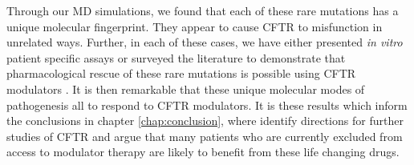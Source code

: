 Through our MD simulations, we found that each of these rare mutations has a unique molecular fingerprint. They appear to cause CFTR to misfunction in unrelated ways. Further, in each of these cases, we have either presented \textit{in vitro} patient specific assays or surveyed the literature to demonstrate that pharmacological rescue of these rare mutations is possible using CFTR modulators \cite{R334W_Euro_CF_trial}.  It is then remarkable that these unique molecular modes of pathogenesis all to respond to CFTR modulators. It is these results which inform the conclusions in chapter \ref{chap:conclusion}, where identify directions for further studies of CFTR and argue that many patients who are currently excluded from access to modulator therapy are likely to benefit from these life changing drugs. 


